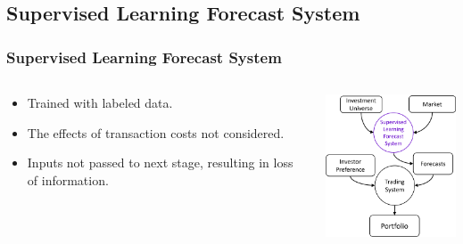 \subsection{Supervised Learning Forecast System}
\begin{frame}
\frametitle{Supervised Learning Forecast System}
\begin{columns}
\begin{column}{0.55\textwidth}
\begin{itemize}
\item
Trained with labeled data.
\item The effects of transaction costs not considered.
\item
Inputs not passed to next stage, resulting in loss of information.
\end{itemize}
\end{column}
\begin{column}{0.45\textwidth}
\begin{center}
\includegraphics[width=4.8cm]{images/supervised_learning.png}
\end{center}
\end{column}
\end{columns}
\end{frame}


